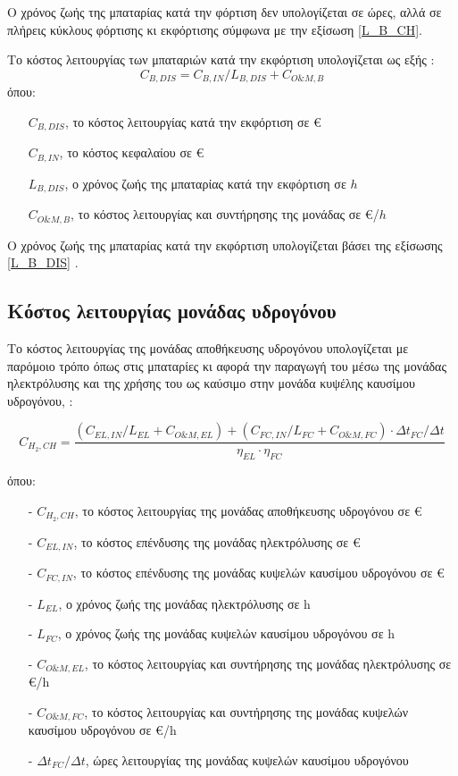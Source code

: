Ο χρόνος ζωής της μπαταρίας κατά την φόρτιση δεν υπολογίζεται σε ώρες, αλλά σε πλήρεις κύκλους φόρτισης κι εκφόρτισης \cite{CAU2014820} σύμφωνα με την εξίσωση \ref{L_B_CH}. 

Το κόστος λειτουργίας των μπαταριών κατά την εκφόρτιση υπολογίζεται ως εξής \cite{CAU2014820}:
\begin{equation}
    C_{B,DIS} = C_{B,IN}/L_{B,DIS} + C_{O\&M,B} \label{C_B_DIS}
\end{equation}
όπου:
\begin{itemize}
  \item[] $C_{B,DIS}$, το κόστος λειτουργίας κατά την εκφόρτιση σε €
  \\
  \item[] $C_{B,IN}$, το κόστος κεφαλαίου σε €
  \\
  \item[] $L_{B,DIS}$, ο χρόνος ζωής της μπαταρίας κατά την εκφόρτιση σε $h$
  \\
  \item[] $C_{O\&M,B}$, το κόστος λειτουργίας και συντήρησης της μονάδας σε €/$h$
\end{itemize}

Ο χρόνος ζωής της μπαταρίας κατά την εκφόρτιση υπολογίζεται βάσει της εξίσωσης \ref{L_B_DIS} \cite{CAU2014820}.

\subsection{Κόστος λειτουργίας μονάδας υδρογόνου}
Το κόστος λειτουργίας της μονάδας αποθήκευσης υδρογόνου υπολογίζεται με παρόμοιο τρόπο όπως στις μπαταρίες κι αφορά την παραγωγή του μέσω της μονάδας ηλεκτρόλυσης και της χρήσης του ως καύσιμο στην μονάδα κυψέλης καυσίμου υδρογόνου, \cite{CAU2014820}:

\begin{equation}
    C_{H_2,CH}=\frac{(C_{EL,IN}/L_{EL}+C_{O\&M,EL})+(C_{FC,IN}/L_{FC}+C_{O\&M,FC})\cdot Δt_{FC}/Δt}{η_{EL}\cdot η_{FC}} \label{C_H2_CH}
\end{equation}

όπου:
\begin{itemize}
  \item[-] $C_{H_2,CH}$, το κόστος λειτουργίας της μονάδας αποθήκευσης υδρογόνου σε €
  \item[-] $C_{EL,IN}$, το κόστος επένδυσης της μονάδας ηλεκτρόλυσης σε €
  \item[-] $C_{FC,IN}$, το κόστος επένδυσης της μονάδας κυψελών καυσίμου υδρογόνου σε €
  \item[-] $L_{EL}$, ο χρόνος ζωής της μονάδας ηλεκτρόλυσης σε h
  \item[-] $L_{FC}$, ο χρόνος ζωής της μονάδας κυψελών καυσίμου υδρογόνου σε h
  \item[-] $C_{O\&M,EL}$, το κόστος λειτουργίας και συντήρησης της μονάδας ηλεκτρόλυσης σε €/h
  \item[-] $C_{O\&M,FC}$, το κόστος λειτουργίας και συντήρησης της μονάδας κυψελών καυσίμου υδρογόνου σε €/h
  \item[-] $Δt_{FC}/Δt$, ώρες λειτουργίας της μονάδας κυψελών καυσίμου υδρογόνου 
\end{itemize}

